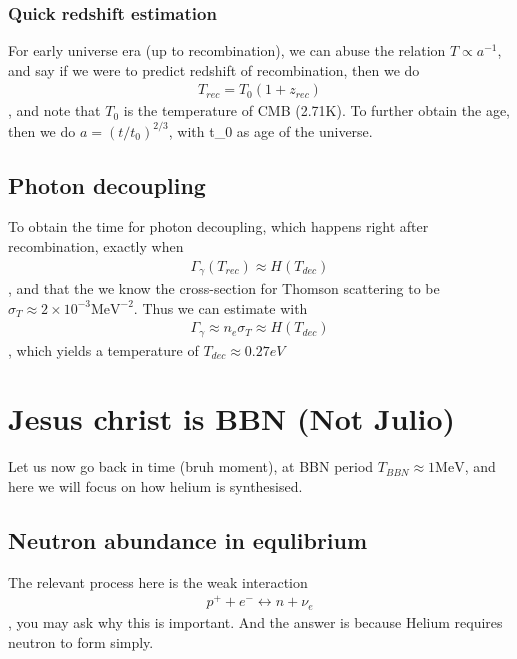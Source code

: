\documentclass[a4paper, 12pt]{article}
\begin{document}
{{\subsubsection{Quick redshift estimation}%
  \label{sub:Quick redshift estimation}
  For early universe era (up to recombination), we can abuse the
  relation \( T \propto a^{-1}  \), and say if we were to predict redshift
  of recombination, then we do 
  \begin{align}
    \label{redshift of recombination}
    T_{rec}  = T_0 ( 1 + z_{rec} )
  \end{align}, and note that \( T_0 \) is the temperature of CMB (2.71K).
  To further obtain the age, then we do \( a = (t/t_0)^{2/3} \), with t_0
  as age of the universe.
 
 \subsection{Photon decoupling}%
  \label{sub:Photon decoupling}
  To obtain the time for photon decoupling, which happens right after
  recombination, exactly when 
  \begin{align}
    \label{photon decoupling}
    \Gamma_{\gamma}(T_{rec}) \approx H(T_{dec})
  \end{align}, and that the we know the cross-section for Thomson scattering
  to be \( \sigma_T \approx 2 \times 10^{-3} \mathrm{MeV}^{-2}  \). Thus
  we can estimate with
  \begin{align}
    \label{estimating photon decoupling}
    \Gamma_{\gamma} \approx n_e \sigma_T \approx H(T_{dec})
  \end{align}, which yields a temperature of \( T_{dec} \approx 0.27 eV\)

  \section{Jesus christ is BBN (Not Julio)}%
    \label{sec:Jesus christ is BBN (Not Julio)}
   
   Let us now go back in time (bruh moment), at BBN period \( T_{BBN}
   \approx 1 \mathrm{MeV} \), and here we will focus on how helium is
   synthesised. 

   \subsection{Neutron abundance in equlibrium}%
    \label{sub:Neutron abundance in equlibrium}
  
    The relevant process here is the weak interaction
    \begin{align}
      \label{neutron abundance}
      p^+ + e^- \leftrightarrow n + \nu_e
    \end{align}, you may ask why this is important. And the answer
    is because Helium requires neutron to form simply. 
   
}}
\end{document}
